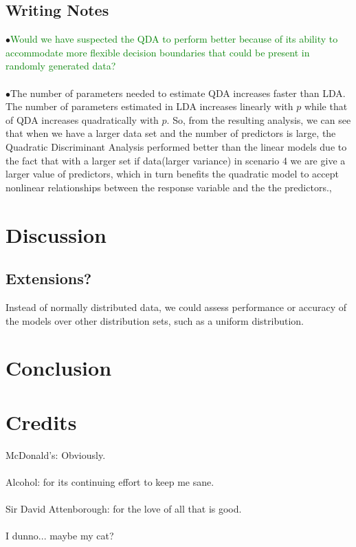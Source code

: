 \documentclass[11pt, oneside]{article}
\begin{document}
\subsection*{Writing Notes}
$\bullet$\textcolor{green}{Would we have suspected the QDA to perform better because of its ability to accommodate more flexible decision boundaries that could be present in randomly generated data?}\\
\\
$\bullet$The number of parameters needed to estimate QDA increases faster than LDA. The number of parameters estimated in LDA increases linearly with $p$ while that of QDA increases quadratically with $p$. So, from the resulting analysis, we can see that when  we have a larger data set and the number of predictors is large, the Quadratic Discriminant Analysis  performed better  than the linear models due to the fact that with a larger set if data(larger variance) in scenario 4 we are give  a larger value of predictors, which in turn benefits the quadratic model to accept nonlinear relationships between the response variable and the the predictors.,



\pagebreak
\section*{Discussion}




\subsection*{Extensions?}
 Instead of normally distributed data, we could assess performance or accuracy of the models over other distribution sets, such as a uniform distribution.


\pagebreak
\section{Conclusion}



\section{Credits}
McDonald's: Obviously.\\
\\
Alcohol: for its continuing effort to keep me sane.\\
\\
Sir David Attenborough: for the love of all that is good.\\
\\
I dunno... maybe my cat?
\end{document}
